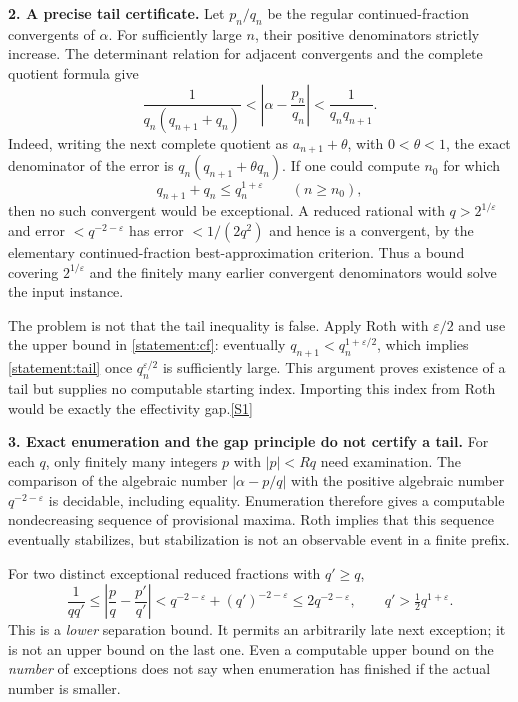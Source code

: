 \documentclass[11pt,a4paper]{article}
\newcommand{\eps}{\varepsilon}
\newcommand{\sref}[2]{\hyperlink{source:#1:#2}{[S#2]}}
\begin{document}
\textbf{2. A precise tail certificate.}
Let $p_n/q_n$ be the regular continued-fraction convergents of $\alpha$.
For sufficiently large $n$, their positive denominators strictly increase.
The determinant relation for adjacent convergents and the complete
quotient formula give
\begin{equation}\label{statement:cf}
 \frac{1}{q_n(q_{n+1}+q_n)}
 <\left|\alpha-\frac{p_n}{q_n}\right|
 <\frac{1}{q_nq_{n+1}}.
\end{equation}
Indeed, writing the next complete quotient as $a_{n+1}+\theta$, with
$0<\theta<1$, the exact denominator of the error is
$q_n(q_{n+1}+\theta q_n)$.
If one could compute $n_0$ for which
\begin{equation}\label{statement:tail}
 q_{n+1}+q_n\le q_n^{1+\eps}\qquad(n\ge n_0),
\end{equation}
then no such convergent would be exceptional. A reduced rational with
$q>2^{1/\eps}$ and error $<q^{-2-\eps}$ has error $<1/(2q^2)$ and hence
is a convergent, by the elementary continued-fraction best-approximation
criterion. Thus a bound covering $2^{1/\eps}$ and the finitely many earlier
convergent denominators would solve the input instance.

The problem is not that the tail inequality is false. Apply Roth with
$\eps/2$ and use the upper bound in \eqref{statement:cf}: eventually
$q_{n+1}<q_n^{1+\eps/2}$, which implies \eqref{statement:tail} once
$q_n^{\eps/2}$ is sufficiently large. This argument proves existence of a
tail but supplies no computable starting index. Importing this index from
Roth would be exactly the effectivity gap.\sref{statement}{1}

\textbf{3. Exact enumeration and the gap principle do not certify a tail.}
For each $q$, only finitely many integers $p$ with $|p|<Rq$ need examination.
The comparison of the algebraic number $|\alpha-p/q|$ with the positive
algebraic number $q^{-2-\eps}$ is decidable, including equality. Enumeration
therefore gives a computable nondecreasing sequence of provisional maxima.
Roth implies that this sequence eventually stabilizes, but stabilization
is not an observable event in a finite prefix.

For two distinct exceptional reduced fractions with $q'\ge q$,
\[
 \frac1{qq'}\le\left|\frac pq-\frac{p'}{q'}\right|
 <q^{-2-\eps}+(q')^{-2-\eps}\le2q^{-2-\eps},
 \qquad q'>\tfrac12q^{1+\eps}.
\]
This is a \emph{lower} separation bound. It permits an arbitrarily late
next exception; it is not an upper bound on the last one. Even a computable
upper bound on the \emph{number} of exceptions does not say when enumeration
has finished if the actual number is smaller.
\end{document}
